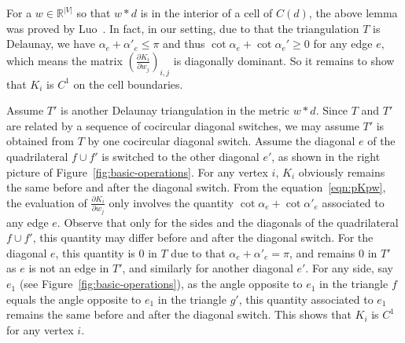 \documentclass[11pt]{article}
\newenvironment{proof}[1][Proof]{\begin{trivlist}
\item[\hskip \labelsep {\bfseries #1}]}{\end{trivlist}}
\begin{document}
\begin{proof}
For a $w \in \mathbb{R}^{|V|}$ so that $w*d$ is in the interior of a cell of $C(d)$, the above lemma was proved 
by Luo~\cite{luo}. In fact, in our setting, due to that the triangulation $T$ is Delaunay, we have  
$\alpha_e + \alpha'_e\leq \pi$ and thus $\cot\alpha_e + \cot \alpha_e'\geq 0$ for any edge $e$, which means the 
matrix $(\frac{\partial K_i}{\partial w_j})_{i, j}$ is diagonally dominant. 
So it remains to show that $K_i$ is $C^1$ on the cell boundaries.

Assume $T'$ is another Delaunay triangulation in the metric $w*d$. Since $T$ and $T'$ are related by a sequence of 
cocircular diagonal switches, we may assume $T'$ is obtained from $T$ by one cocircular diagonal switch. 
Assume the diagonal $e$ of the quadrilateral $f\cup f'$ is switched to the other diagonal $e'$, as shown in 
the right picture of Figure~\ref{fig:basic-operations}. 
For any vertex $i$, $K_i$ obviously remains the same before and after the diagonal switch. From the equation~\eqref{eqn:pKpw}, 
the evaluation of $\frac{\partial K_i}{\partial w_j}$ only involves the quantity $\cot\alpha_e + \cot \alpha'_e$ 
associated to any edge $e$. Observe that only for the sides and the diagonals of the quadrilateral $f\cup f'$, 
this quantity may differ before and after the diagonal switch. For the diagonal $e$, this quantity is $0$ in $T$ 
due to that  $\alpha_e + \alpha'_e = \pi$, and remains $0$ in $T'$ as $e$ is not an edge in $T'$, and 
similarly for another diagonal $e'$. For any side, say $e_1$ (see Figure~\ref{fig:basic-operations}), 
as the angle opposite to $e_1$ in the triangle $f$ equals the angle opposite to $e_1$ in the triangle $g'$, 
this quantity associated to $e_1$ remains the same before and 
after the diagonal switch. This shows that $K_i$ is $C^1$ for any vertex $i$. 
\end{proof}
\end{document}
